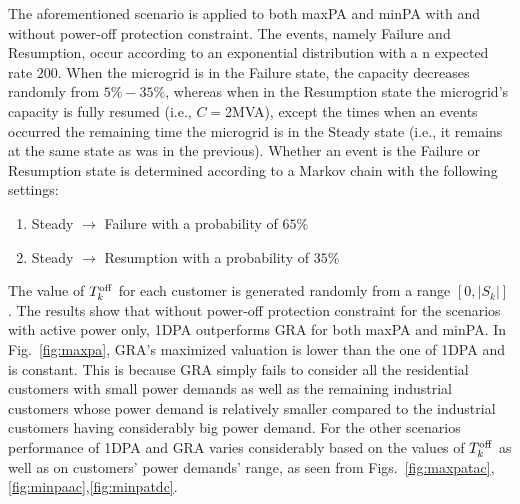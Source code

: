 The aforementioned scenario is applied to both {\sc maxPA} and {\sc minPA}  with and without power-off protection constraint. The events, namely Failure and Resumption, occur according to an exponential distribution with a n expected rate $200$. When the microgrid is in the Failure state, the capacity decreases randomly from $5\%-35\%$, whereas when in the Resumption state the microgrid's capacity is fully resumed (i.e.,  $C=$2MVA), except the times when an events occurred the remaining time the microgrid is in the Steady state (i.e., it remains at the same state as was in the previous). Whether an event is the Failure or Resumption state is determined according to a Markov chain with the following settings:
 \begin{enumerate}
 \item Steady $\rightarrow$ Failure with a probability of $65\%$
 \item Steady $\rightarrow$ Resumption with a probability of $35\%$
 \end{enumerate}
 
The value of $T^{\rm off}_k$ for each customer is generated randomly from a range $[0, |S_k| ]$. The results show that without power-off protection constraint for the scenarios with active power only, {\sc 1DPA} outperforms {\sc GRA} for both {\sc maxPA} and {\sc minPA}. In Fig.~\ref{fig:maxpa}, {\sc GRA}'s maximized valuation is lower than the one of {\sc 1DPA} and is constant. This is because {\sc GRA} simply fails to consider all the residential customers with small power demands as well as the remaining industrial customers whose power demand is relatively smaller compared to the industrial customers having considerably big power demand. For the other scenarios performance of {\sc 1DPA} and {\sc GRA} varies considerably based on the values of $T^{\rm off}_k$ as well as on customers' power demands' range, as seen from Figs.~\ref{fig:maxpatac},\ref{fig:minpaac},\ref{fig:minpatdc}.
